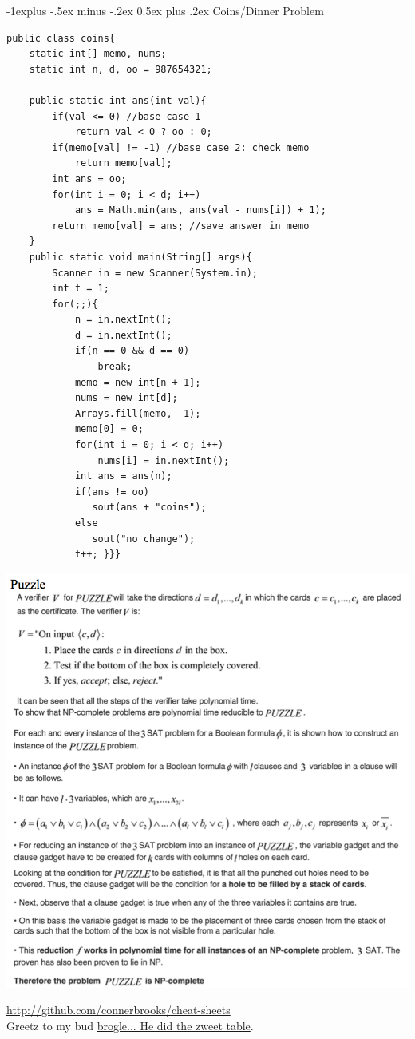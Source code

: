 \documentclass[10pt,landscape]{article}
\makeatletter
\renewcommand{\subsection}{\@startsection{subsection}{2}{0mm}%
                                {-1explus -.5ex minus -.2ex}%
                                {0.5ex plus .2ex}%
                                {\normalfont\normalsize\bfseries}}
\makeatother
\begin{document}
\begin{multicols}{3}
\subsection{Coins/Dinner Problem}
\begin{lstlisting}
public class coins{
    static int[] memo, nums;
    static int n, d, oo = 987654321;

    public static int ans(int val){
        if(val <= 0) //base case 1
            return val < 0 ? oo : 0;
        if(memo[val] != -1) //base case 2: check memo
            return memo[val];
        int ans = oo;
        for(int i = 0; i < d; i++)
            ans = Math.min(ans, ans(val - nums[i]) + 1);
        return memo[val] = ans; //save answer in memo
    }
    public static void main(String[] args){
        Scanner in = new Scanner(System.in);
        int t = 1;
        for(;;){
            n = in.nextInt();
            d = in.nextInt();
            if(n == 0 && d == 0)
                break;
            memo = new int[n + 1];
            nums = new int[d];
            Arrays.fill(memo, -1);
            memo[0] = 0;
            for(int i = 0; i < d; i++)
                nums[i] = in.nextInt();
            int ans = ans(n);
            if(ans != oo)
               sout(ans + "coins"); 
            else
               sout("no change");
            t++; }}}
\end{lstlisting}
\includegraphics[width=1\linewidth]{puzzle}


\vspace{5pt}
\href{http://github.com/connerbrooks/cheat-sheets}{http://github.com/connerbrooks/cheat-sheets}\\
Greetz to my bud \href{http://github.com/broglea}{brogle... He did the zweet table}.

\end{multicols}
\end{document}
